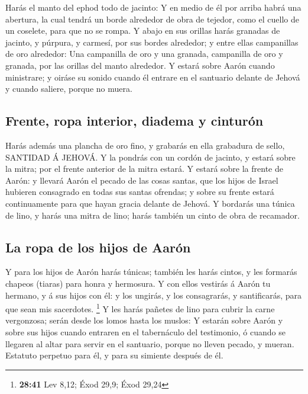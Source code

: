  Harás el manto del ephod todo de jacinto:
 Y en medio de él por arriba habrá una abertura, la cual
tendrá un borde alrededor de obra de tejedor, como el cuello de un
coselete, para que no se rompa.  Y abajo en sus orillas
harás granadas de jacinto, y púrpura, y carmesí, por sus bordes
alrededor; y entre ellas campanillas de oro alrededor: 
Una campanilla de oro y una granada, campanilla de oro y granada, por
las orillas del manto alrededor.  Y estará sobre Aarón
cuando ministrare; y oiráse su sonido cuando él entrare en el santuario
delante de Jehová y cuando saliere, porque no muera.

\hypertarget{frente-ropa-interior-diadema-y-cinturuxf3n}{%
\subsection{Frente, ropa interior, diadema y
cinturón}\label{frente-ropa-interior-diadema-y-cinturuxf3n}}

 Harás además una plancha de oro fino, y grabarás en ella
grabadura de sello, SANTIDAD Á JEHOVÁ.  Y la pondrás con
un cordón de jacinto, y estará sobre la mitra; por el frente anterior de
la mitra estará.  Y estará sobre la frente de Aarón: y
llevará Aarón el pecado de las cosas santas, que los hijos de Israel
hubieren consagrado en todas sus santas ofrendas; y sobre su frente
estará continuamente para que hayan gracia delante de Jehová.
 Y bordarás una túnica de lino, y harás una mitra de
lino; harás también un cinto de obra de recamador.

\hypertarget{la-ropa-de-los-hijos-de-aaruxf3n}{%
\subsection{La ropa de los hijos de
Aarón}\label{la-ropa-de-los-hijos-de-aaruxf3n}}

 Y para los hijos de Aarón harás túnicas; también les
harás cintos, y les formarás chapeos (tiaras) para honra y hermosura.
 Y con ellos vestirás á Aarón tu hermano, y á sus hijos
con él: y los ungirás, y los consagrarás, y santificarás, para que sean
mis sacerdotes. \footnote{\textbf{28:41} Lev 8,12; Éxod 29,9; Éxod 29,24}
 Y les harás pañetes de lino para cubrir la carne
vergonzosa; serán desde los lomos hasta los muslos:  Y
estarán sobre Aarón y sobre sus hijos cuando entraren en el tabernáculo
del testimonio, ó cuando se llegaren al altar para servir en el
santuario, porque no lleven pecado, y mueran. Estatuto perpetuo para él,
y para su simiente después de él.

